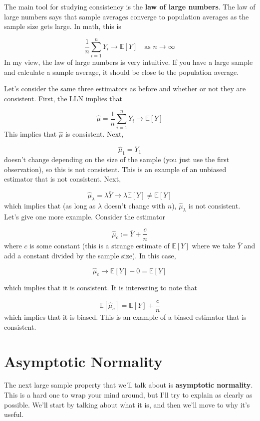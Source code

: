 \documentclass[
  letterpaper,
  DIV=11,
  numbers=noendperiod]{scrreprt}
\begin{document}
The main tool for studying consistency is the \textbf{law of large
numbers}. The law of large numbers says that sample averages converge to
population averages as the sample size gets large. In math, this is

\[
  \frac{1}{n} \sum_{i=1}^n Y_i \rightarrow \mathbb{E}[Y] \quad \textrm{as } n \rightarrow \infty
\] In my view, the law of large numbers is very intuitive. If you have a
large sample and calculate a sample average, it should be close to the
population average.

Let's consider the same three estimators as before and whether or not
they are consistent. First, the LLN implies that

\[
  \hat{\mu} = \frac{1}{n} \sum_{i=1}^n Y_i \rightarrow \mathbb{E}[Y]
\] This implies that \(\hat{\mu}\) is consistent. Next,

\[
  \hat{\mu}_1 = Y_1
\] doesn't change depending on the size of the sample (you just use the
first observation), so this is not consistent. This is an example of an
unbiased estimator that is not consistent. Next,

\[
  \hat{\mu}_\lambda = \lambda \bar{Y} \rightarrow \lambda \mathbb{E}[Y] \neq \mathbb{E}[Y]
\] which implies that (as long as \(\lambda\) doesn't change with
\(n\)), \(\hat{\mu}_{\lambda}\) is not consistent. Let's give one more
example. Consider the estimator

\[
  \hat{\mu}_c := \bar{Y} + \frac{c}{n}
\] where \(c\) is some constant (this is a strange estimate of
\(\mathbb{E}[Y]\) where we take \(\bar{Y}\) and add a constant divided
by the sample size). In this case,

\[
  \hat{\mu}_c \rightarrow \mathbb{E}[Y] + 0 = \mathbb{E}[Y]
\]

which implies that it is consistent. It is interesting to note that

\[
  \mathbb{E}[\hat{\mu}_c] = \mathbb{E}[Y] + \frac{c}{n}
\] which implies that it is biased. This is an example of a biased
estimator that is consistent.

\section{Asymptotic Normality}\label{asymptotic-normality}

The next large sample property that we'll talk about is
\textbf{asymptotic normality}. This is a hard one to wrap your mind
around, but I'll try to explain as clearly as possible. We'll start by
talking about what it is, and then we'll move to why it's useful.
\end{document}
